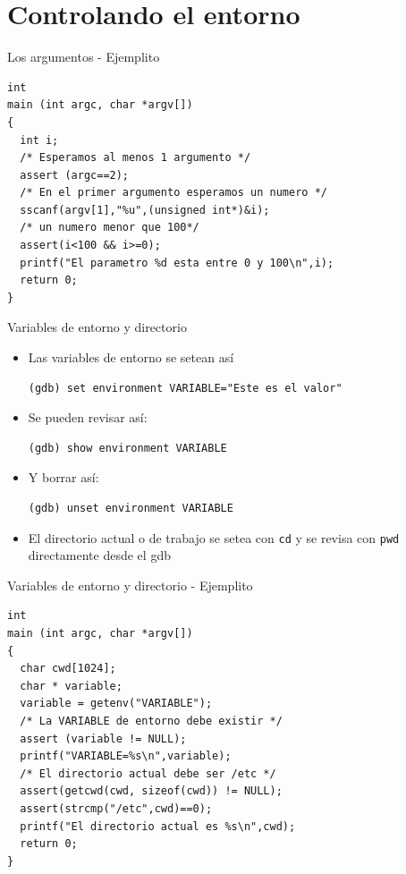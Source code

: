\documentclass[xetex]{beamer}
\begin{document}
\section{Controlando el entorno}

\begin{frame}[fragile]{Los argumentos - Ejemplito}
\begin{lstlisting}
int
main (int argc, char *argv[])
{
  int i;
  /* Esperamos al menos 1 argumento */
  assert (argc==2);
  /* En el primer argumento esperamos un numero */
  sscanf(argv[1],"%u",(unsigned int*)&i);
  /* un numero menor que 100*/
  assert(i<100 && i>=0);
  printf("El parametro %d esta entre 0 y 100\n",i);
  return 0;
}
\end{lstlisting}
\end{frame}

\begin{frame}[fragile]{Variables de entorno y directorio}
\begin{itemize}
\item Las variables de entorno se setean así
\begin{verbatim}
(gdb) set environment VARIABLE="Este es el valor"
\end{verbatim}
\item Se pueden revisar así:
\begin{verbatim}
(gdb) show environment VARIABLE
\end{verbatim}
\item Y borrar así:
\begin{verbatim}
(gdb) unset environment VARIABLE
\end{verbatim}
\item El directorio actual o de trabajo se setea con \verb=cd= y se revisa con \verb=pwd= directamente desde el gdb
\end{itemize}
\end{frame}


\begin{frame}[fragile]{Variables de entorno y directorio - Ejemplito}
\begin{lstlisting}
int
main (int argc, char *argv[])
{
  char cwd[1024];
  char * variable;
  variable = getenv("VARIABLE");
  /* La VARIABLE de entorno debe existir */
  assert (variable != NULL);
  printf("VARIABLE=%s\n",variable);
  /* El directorio actual debe ser /etc */
  assert(getcwd(cwd, sizeof(cwd)) != NULL);
  assert(strcmp("/etc",cwd)==0);
  printf("El directorio actual es %s\n",cwd);
  return 0;
}
\end{lstlisting}
\end{frame}
\end{document}
